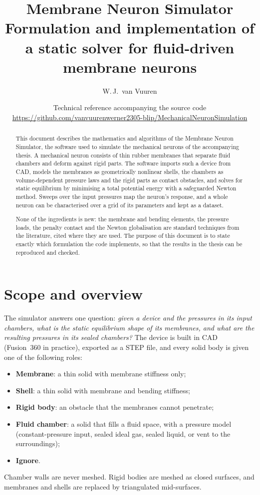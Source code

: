 \documentclass[11pt,a4paper]{article}
\title{\textbf{Membrane Neuron Simulator}\\[4pt]
\large Formulation and implementation of a static solver for fluid-driven membrane neurons}
\author{W.\,J.\ van Vuuren}
\date{Technical reference accompanying the source code\\
\url{https://github.com/vanvuurenwerner2305-blip/MechanicalNeuronSimulation}}
\theoremstyle{remark}
\begin{document}
\maketitle

\begin{abstract}
This document describes the mathematics and algorithms of the Membrane Neuron Simulator, the
software used to simulate the mechanical neurons of the accompanying thesis. A mechanical neuron
consists of thin rubber membranes that separate fluid chambers and deform against rigid parts.
The software imports such a device from CAD, models the membranes as geometrically nonlinear
shells, the chambers as volume-dependent pressure laws and the rigid parts as contact obstacles,
and solves for static equilibrium by minimising a total potential energy with a safeguarded
Newton method. Sweeps over the input pressures map the neuron's response, and a whole neuron can be
characterised over a grid of its parameters and kept as a dataset.

None of the ingredients is new: the membrane and bending elements, the pressure loads, the
penalty contact and the Newton globalisation are standard techniques from the literature, cited
where they are used. The purpose of this document is to state exactly which formulation the code
implements, so that the results in the thesis can be reproduced and checked.
\end{abstract}

\tableofcontents
\newpage

\section{Scope and overview}

The simulator answers one question: \emph{given a device and the pressures in its input
chambers, what is the static equilibrium shape of its membranes, and what are the resulting
pressures in its sealed chambers?} The device is built in CAD (Fusion~360 in practice),
exported as a STEP file, and every solid body is given one of the following roles:
\begin{itemize}[noitemsep]
  \item \textbf{Membrane}: a thin solid with membrane stiffness only;
  \item \textbf{Shell}: a thin solid with membrane and bending stiffness;
  \item \textbf{Rigid body}: an obstacle that the membranes cannot penetrate;
  \item \textbf{Fluid chamber}: a solid that fills a fluid space, with a pressure model
        (constant-pressure input, sealed ideal gas, sealed liquid, or vent to the surroundings);
  \item \textbf{Ignore}.
\end{itemize}
Chamber walls are never meshed. Rigid bodies are meshed as closed surfaces, and membranes and
shells are replaced by triangulated mid-surfaces.
\end{document}
